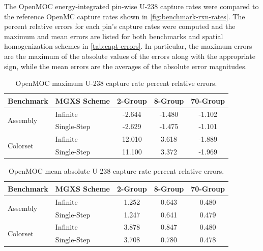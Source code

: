 The OpenMOC energy-integrated pin-wise U-238 capture rates were compared to the reference OpenMC capture rates shown in \autoref{fig:benchmark-rxn-rates}. The percent relative errors for each pin's capture rates were computed and the maximum and mean errors are listed for both benchmarks and spatial homogenization schemes in \autoref{tab:capt-errors}. In particular, the maximum errors are the maximum of the absolute values of the errors along with the appropriate sign, while the mean errors are the averages of the absolute error magnitudes.

\begin{table}[h!]
  \centering
  \caption{OpenMOC maximum U-238 capture rate percent relative errors.}
  \label{tab:fiss-errors}
  \begin{tabular}{l l c c c}
  \toprule
  \textbf{Benchmark} & \textbf{MGXS Scheme} & \textbf{2-Group} & \textbf{8-Group} & \textbf{70-Group} \\
  \midrule
  \multirow{2}{*}{Assembly} & Infinite    & -2.644 & -1.480 & -1.102 \\
                            & Single-Step & -2.629 & -1.475 & -1.101 \\
  \midrule
  \multirow{2}{*}{Colorset} & Infinite    & 12.010 & 3.618 & -1.889 \\
                            & Single-Step & 11.100 & 3.372 & -1.969 \\
  \bottomrule
\end{tabular}
\end{table}

\begin{table}[h!]
  \centering
  \caption{OpenMOC mean absolute U-238 capture rate percent relative errors.}
  \label{tab:fiss-errors}
  \begin{tabular}{l l c c c}
  \toprule
  \textbf{Benchmark} & \textbf{MGXS Scheme} & \textbf{2-Group} & \textbf{8-Group} & \textbf{70-Group} \\
  \midrule
  \multirow{2}{*}{Assembly} & Infinite    & 1.252 & 0.643 & 0.480 \\
                            & Single-Step & 1.247 & 0.641 & 0.479 \\
  \midrule
  \multirow{2}{*}{Colorset} & Infinite    & 3.878 & 0.847 & 0.480 \\
                            & Single-Step & 3.708 & 0.780 & 0.478 \\
  \bottomrule
\end{tabular}
\end{table}

